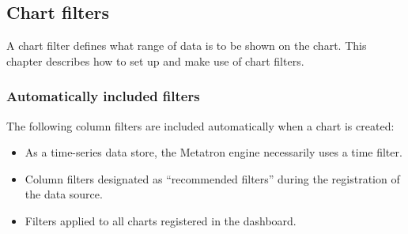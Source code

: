 \documentclass[letterpaper,10pt,english]{sphinxmanual}
\begin{document}
\subsection{Chart filters}
\label{\detokenize{discovery/part04/chart_filter:id1}}\label{\detokenize{discovery/part04/chart_filter::doc}}
A chart filter defines what range of data is to be shown on the chart. This chapter describes how to set up and make use of chart filters.


\subsubsection{Automatically included filters}
\label{\detokenize{discovery/part04/chart_filter:id2}}
The following column filters are included automatically when a chart is created:
\begin{itemize}
\item {} 
 As a time-series data store, the Metatron engine necessarily uses a time filter.

\item {} 
 Column filters designated as “recommended filters” during the registration of the data source.

\item {} 
 Filters applied to all charts registered in the dashboard.

\end{itemize}
\end{document}
